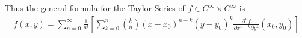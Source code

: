 \documentclass[12pt]{article}
\begin{document}
\noindent Thus the general formula for the Taylor Series of $f \in C^{\infty}\times C^{\infty}$ is 
\begin{align*}
f(x, y) = \sum_{n=0}^{\infty}\frac{1}{n!}\left[\sum_{k=0}^{n}\binom{k}{n}(x - x_0)^{n - k}(y - y_0)^{k}\frac{\partial^{n} f}{\partial x^{n - k} \partial y^{k}}(x_0, y_0)\right]
\end{align*}

%
%
%
%
%
%
\end{document}
